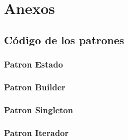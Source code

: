 \chapter{Anexos}
\section{Código de los patrones}
\subsection{Patron Estado}

%
\clearpage
\subsection{Patron Builder}

\subsection{Patron Singleton}


\subsection{Patron Iterador}

